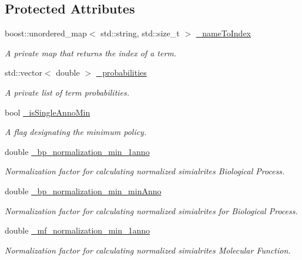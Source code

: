 \subsection*{Protected Attributes}
\begin{DoxyCompactItemize}
\item 
boost\+::unordered\+\_\+map$<$ std\+::string, std\+::size\+\_\+t $>$ \hyperlink{classTermProbabilityMap_af94f810eb87afe5c7bddb14d19735e86}{\+\_\+name\+To\+Index}
\begin{DoxyCompactList}\small\item\em A private map that returns the index of a term. \end{DoxyCompactList}\item 
std\+::vector$<$ double $>$ \hyperlink{classTermProbabilityMap_a1cbbbb63e115e69359e2d4fb65be6227}{\+\_\+probabilities}
\begin{DoxyCompactList}\small\item\em A private list of term probabilities. \end{DoxyCompactList}\item 
bool \hyperlink{classTermProbabilityMap_a7cb93d7a55e3002065838f16a1f8c282}{\+\_\+is\+Single\+Anno\+Min}
\begin{DoxyCompactList}\small\item\em A flag designating the minimum policy. \end{DoxyCompactList}\item 
double \hyperlink{classTermProbabilityMap_a1bdc8b5b73d1686abbaf1f5dd698d500}{\+\_\+bp\+\_\+normalization\+\_\+min\+\_\+1anno}
\begin{DoxyCompactList}\small\item\em Normalization factor for calculating normalized simialrites Biological Process. \end{DoxyCompactList}\item 
double \hyperlink{classTermProbabilityMap_aedd2c51ffd41664ef2dd714bde4aa5fa}{\+\_\+bp\+\_\+normalization\+\_\+min\+\_\+min\+Anno}
\begin{DoxyCompactList}\small\item\em Normalization factor for calculating normalized simialrites for Biological Process. \end{DoxyCompactList}\item 
double \hyperlink{classTermProbabilityMap_a9c240b82c9cec69d2d777b3a95d81891}{\+\_\+mf\+\_\+normalization\+\_\+min\+\_\+1anno}
\begin{DoxyCompactList}\small\item\em Normalization factor for calculating normalized simialrites Molecular Function. \end{DoxyCompactList}\item 

\end{DoxyCompactItemize}
